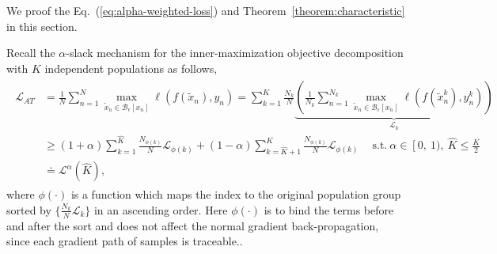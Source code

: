 \documentclass{article} %
\newcommand{\bx}{{x}}
\newcommand{\epsball}{\mathcal{B}_\epsilon}
\newcommand{\xadv}{\tilde{{x}}}
\theoremstyle{plain}
\theoremstyle{definition}
\theoremstyle{remark}
\begin{document}
We proof the Eq.~(\ref{eq:alpha-weighted-loss}) and Theorem~\ref{theorem:characteristic} in this section.

Recall the $\alpha$-slack mechanism for the inner-maximization objective decomposition with $K$ independent populations as follows,
\begin{align} \label{eq:alpha-weighted-loss-app}
    \begin{split}
        \mathcal{L}_{AT} & = \frac{1}{N}\sum_{n=1}^N \max_{\xadv_n\in\epsball[\bx_n]} \ell(f(\xadv_n), y_n) = \sum_{k=1}^K \frac{N_k}{N}\underbrace{\left(\frac{1}{N_k}\sum_{n=1}^{N_k}\max_{\xadv_n\in\epsball[\bx_n]}\ell(f(\xadv_n^k), y_n^k)\right)}_{\mathcal{L}_k} \\
        & \geq (1+\alpha) \sum_{k=1}^{\widehat{K}} \frac{N_{\phi(k)}}{N}\mathcal{L}_{\phi(k)} + (1-\alpha) \sum_{k=\widehat{K}+1}^{K} \frac{N_{\phi(k)}}{N}\mathcal{L}_{\phi(k)}~\quad \text{s.t.}~\alpha\in\left[0,~1\right.),~\widehat{K}\leq \frac{K}{2}\\
        & \doteq \mathcal{L}^\alpha(\widehat{K}), 
    \end{split}
\end{align}
where $\phi(\cdot)$ is a function which maps the index to the original population group sorted by $\{\frac{N_k}{N}\mathcal{L}_k\}$ in an ascending order. Here $\phi(\cdot)$ is to bind the terms before and after the sort and does not affect the normal gradient back-propagation, since each gradient path of samples is traceable..
\end{document}

